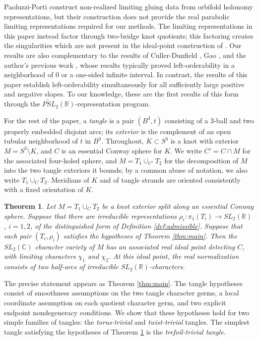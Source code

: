 \documentclass{article}
\theoremstyle{plain}
\theoremstyle{definition}
\theoremstyle{plain}
\theoremstyle{plain}
\theoremstyle{plain}
\theoremstyle{remark}
\theoremstyle{remark}
\theoremstyle{plain}
\theoremstyle{plain}
\newcounter{main}
\theoremstyle{plain}
\newtheorem{mainthm}[main]{\textbf{Theorem}}
\theoremstyle{plain}
\begin{document}
Paoluzzi-Porti \cite{paoluzziporti} construct non-realized limiting gluing data from orbifold holonomy representations, but their construction does not provide the real parabolic limiting representations required for our methods. The limiting representations in this paper instead factor through two-bridge knot quotients; this factoring creates the singularities which are not present in the ideal-point construction of \cite{paoluzziporti}. Our results are also complementary to the results of Culler-Dunfield \cite{cullerdunfield}, Gao \cite{gao}, and the author's previous work \cite{WangDetectedSeifertSurfaces}, whose results typically proved left-orderability in a neighborhood of 0 or a one-sided infinite interval. In contrast, the results of this paper establish left-orderability simultaneously for all sufficiently large positive and negative slopes. To our knowledge, these are the first results of this form through the $\widetilde{PSL}_2(\mathbb R)$-representation program.

\medskip

For the rest of the paper, a \emph{tangle} is a pair $(B^3, t)$ consisting of a 3-ball and two properly embedded disjoint arcs; its \emph{exterior} is the complement of an open tubular neighborhood of $t$ in $B^3$. Throughout, $K \subset S^3$ is a knot with exterior $M = S^3 \setminus K$, and $C$ is an essential Conway sphere for $K$. We write $C' = C \cap M$ for the associated four-holed sphere, and $M = T_1 \cup_{C'}T_2$ for the decomposition of $M$ into the two tangle exteriors it bounds; by a common abuse of notation, we also write $T_1 \cup_CT_2$. Meridians of $K$ and of tangle strands are oriented consistently with a fixed orientation of $K$.

\begin{mainthm}\label{mainthm:a}
Let $M=T_1\cup_C T_2$ be a knot exterior split along an essential Conway sphere. Suppose that there are irreducible representations $\rho_i: \pi_1(T_i) \to SL_2(\mathbb{R})$, $i = 1, 2$, of the distinguished form of Definition \ref{def:admissible}. Suppose that each pair $(T_i, \rho_i)$ satisfies the hypotheses of Theorem \ref{thm:main}. Then the $SL_2(\mathbb C)$ character variety of $M$ has an associated real ideal point detecting $C$, with limiting characters $\chi_1$ and $\chi_2$. At this ideal point, the real normalization consists of two half-arcs of irreducible $SL_2(\mathbb{R})$-characters.
\end{mainthm}

The precise statement appears as Theorem \ref{thm:main}. The tangle hypotheses consist of smoothness assumptions on the two tangle character germs, a local coordinate assumption on each quotient character germ, and two explicit endpoint nondegeneracy conditions. We show that these hypotheses hold for two simple families of tangles: the \emph{torus-trivial} and \emph{twist-trivial} tangles. The simplest tangle satisfying the hypotheses of Theorem \ref{mainthm:a} is the \emph{trefoil-trivial tangle}.
\end{document}
